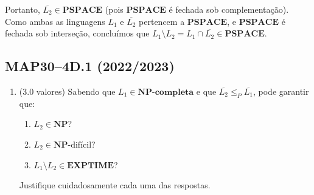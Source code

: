 \documentclass[a4paper,12pt]{article}
\begin{document}
\begin{enumerate}[label=\alph*)]
\begin{enumerate}[label=(\roman*)]
    \vspace{0.3cm}
    Portanto, \( \overline{L_2} \in \mathbf{PSPACE} \) (pois \( \mathbf{PSPACE} \) é fechada sob complementação). Como ambas as linguagens \( L_1 \) e \( \overline{L_2} \) pertencem a \( \mathbf{PSPACE} \), e \( \mathbf{PSPACE} \) é fechada sob interseção, concluímos que \( L_1 \setminus L_2 = L_1 \cap \overline{L_2} \in \mathbf{PSPACE} \).
  \end{enumerate}
\end{enumerate}

\vspace{1.0cm}
\subsection*{MAP30–4D.1 (2022/2023)}
\begin{enumerate}[label=\alph*)]
  \item (3.0 valores) Sabendo que \( L_1 \in \textbf{NP}\textbf{-completa} \) e que \( \overline{L_2} \leq_P \overline{L_1} \), pode garantir que:
  
  \begin{enumerate}[label=(\roman*)]
      \item \( L_2 \in \textbf{NP} \)?
      \item \( L_2 \in \textbf{NP}\text{-difícil} \)?
      \item \( L_1 \setminus L_2 \in \textbf{EXPTIME} \)?
  \end{enumerate}
  
  Justifique cuidadosamente cada uma das respostas.
\end{enumerate}
\end{document}
